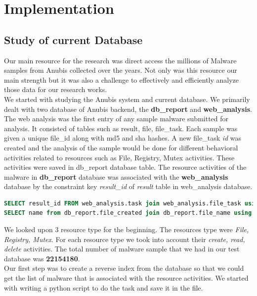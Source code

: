 \chapter{Implementation}\label{chapter:implementation}
\section{Study of current Database}
Our main resource for the research was direct access the millions of Malware samples from Anubis collected over the years. Not only was this resource our main strength but it was also a challenge to effectively and efficiently analyze those data for our research works.\\
We started with studying the Anubis system and current database. We primarily dealt with two database of Anubis backend, the \textbf{db\_report} and \textbf{web\_analysis}.
The web analysis was the first entry of any sample malware submitted for analysis. It consisted of tables such as result, file, file\_task. Each sample was given a unique file\_id along with md5 and sha hashes.
A new file\_task \emph{id} was created  and the analysis of the sample would be done for different behavioral activities related to resources such as File, Registry, Mutex activities.
These activities were saved in db\_report database table. The resource activities of the malware in \textbf{db\_report} database was associated with the \textbf{web\_analysis} database by the constraint key \textit{result\_id} of \emph{result} table in web\_analysis database.
\begin{lstlisting}[language=sql,caption={sql showing database structure to get file created activities of a malware},label={lst:resultidsql}]
SELECT result_id FROM web_analysis.task join web_analysis.file_task using (task_id) join web_analysis.file using (file_id) WHERE task_id=result_id;
SELECT name from db_report.file_created join db_report.file_name using (file_name_id) where result_id ='12345';
\end{lstlisting}
We looked upon 3 resource type for the beginning. The resources type were \textit{File, Registry, Mutex}. For each resource type we took into account their \textit{create, read, delete} activities. The total number of malware sample that we had in our test database was \textbf{22154180}.\\
Our first step was to create a reverse index from the database so that we could get the list of malware that is associated with the resource activities. We started with writing a python script to do the task and save it in the file.

